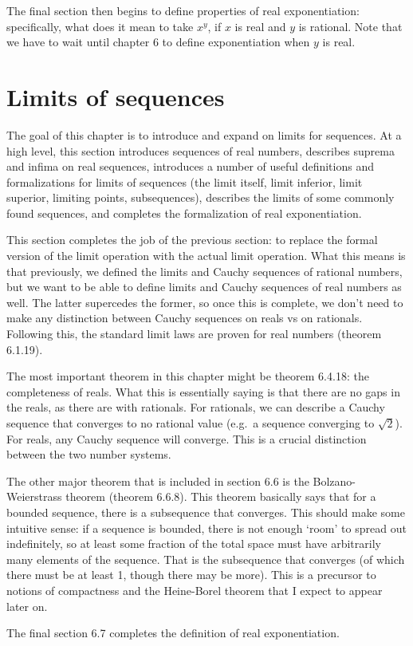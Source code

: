 \documentclass[answers,12pt]{exam}
\begin{document}
The final section then begins to define properties of real exponentiation:
specifically, what does it mean to take $x^y$, if $x$ is real and $y$ is rational.
Note that we have to wait until chapter 6 to define exponentiation when $y$ is real.

\section{Limits of sequences}
The goal of this chapter is to introduce and expand on limits for sequences.
At a high level, this section introduces sequences of real numbers, describes suprema and infima on real sequences, introduces a number of useful definitions and formalizations for limits of sequences (the limit itself, limit inferior, limit superior, limiting points, subsequences), describes the limits of some commonly found sequences, and completes the formalization of real exponentiation.

This section completes the job of the previous section: to replace the formal version of the limit operation with the actual limit operation.
What this means is that previously, we defined the limits and Cauchy sequences of rational numbers, but we want to be able to define limits and Cauchy sequences of real numbers as well.
The latter supercedes the former, so once this is complete, we don't need to make any distinction between Cauchy sequences on reals vs on rationals.
Following this, the standard limit laws are proven for real numbers (theorem 6.1.19).

The most important theorem in this chapter might be theorem 6.4.18: the completeness of reals.
What this is essentially saying is that there are no gaps in the reals, as there are with rationals.
For rationals, we can describe a Cauchy sequence that converges to no rational value (e.g.\ a sequence converging to $\sqrt{2}$).
For reals, any Cauchy sequence will converge.
This is a crucial distinction between the two number systems.

The other major theorem that is included in section 6.6 is the Bolzano-Weierstrass theorem (theorem 6.6.8).
This theorem basically says that for a bounded sequence, there is a subsequence that converges.
This should make some intuitive sense: if a sequence is bounded, there is not enough `room' to spread out indefinitely, so at least some fraction of the total space must have arbitrarily many elements of the sequence.
That is the subsequence that converges (of which there must be at least 1, though there may be more).
This is a precursor to notions of compactness and the Heine-Borel theorem that I expect to appear later on.

The final section 6.7 completes the definition of real exponentiation.
\end{document}
